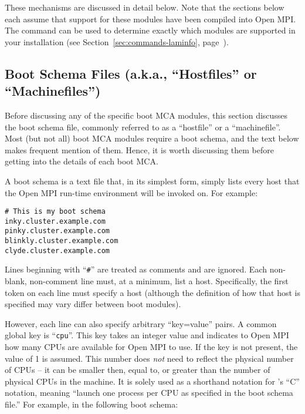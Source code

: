 These mechanisms are discussed in detail below.  Note that the
sections below each assume that support for these modules have been
compiled into Open MPI.  The  command can be used to
determine exactly which modules are supported in your installation
(see Section~\ref{sec:commands-laminfo},
page~\pageref{sec:commands-laminfo}).


\subsection{Boot Schema Files (a.k.a., ``Hostfiles'' or
  ``Machinefiles'')}
\label{sec:mca-orte-pls-schema}

Before discussing any of the specific boot MCA modules, this section
discusses the boot schema file, commonly referred to as a ``hostfile''
or a ``machinefile''.  Most (but not all) boot MCA modules require a
boot schema, and the text below makes frequent mention of them.
Hence, it is worth discussing them before getting into the details of
each boot MCA.

A boot schema is a text file that, in its simplest form, simply lists
every host that the Open MPI run-time environment will be invoked on.  For
example:

\lstset{style=lam-shell}
\begin{lstlisting}
# This is my boot schema
inky.cluster.example.com
pinky.cluster.example.com
blinkly.cluster.example.com
clyde.cluster.example.com
\end{lstlisting}

Lines beginning with ``{\tt \#}'' are treated as comments and are
ignored.  Each non-blank, non-comment line must, at a minimum, list a
host.  Specifically, the first token on each line must specify a host
(although the definition of how that host is specified may vary differ
between boot modules).  

However, each line can also specify arbitrary ``key=value'' pairs.  A
common global key is ``{\tt cpu}''.  This key takes an integer value
and indicates to Open MPI how many CPUs are available for Open MPI to use.  If
the key is not present, the value of 1 is assumed.  This number does
{\em not} need to reflect the physical number of CPUs -- it can be
smaller then, equal to, or greater than the number of physical CPUs in
the machine.  It is solely used as a shorthand notation for
's ``C'' notation, meaning ``launch one process per CPU
as specified in the boot schema file.''  For example, in the following
boot schema:

